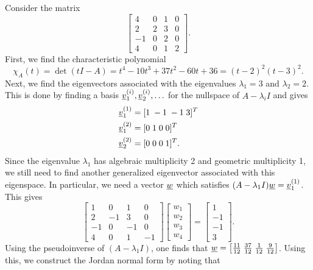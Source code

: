 \begin{example}
Consider the matrix
\begin{equation*}
\begin{bmatrix} 4 & 0 & 1 & 0 \\ 2 & 2 & 3 & 0 \\ -1 & 0 & 2 & 0 \\ 4 & 0 & 1 & 2 \end{bmatrix} .
\end{equation*}
First, we find the characteristic polynomial
\[ \chi_A (t) = \det (t I - A) = t^4 - 10 t^3 + 37 t^2 -60 t + 36 = (t-2)^2 (t-3)^2. \]
Next, we find the eigenvectors associated with the eigenvalues $\lambda_1 = 3$ and $\lambda_2 = 2$.
This is done by finding a basis $\underline{v}^{(i)}_1, \underline{v}^{(i)}_2, \ldots$ for the nullspace of $A - \lambda_i I$ and gives
\begin{align*}
\underline{v}_1^{(1)} & = [ 1 \; -1 \; -1 \; 3 ]^T \\
\underline{v}_1^{(2)} & = [ 0 \; 1 \; 0 \; 0 ]^T \\
\underline{v}_2^{(2)} & = [ 0 \; 0 \; 0 \; 1 ]^T.
\end{align*}
Since the eigenvalue $\lambda_1$ has algebraic multiplicity 2 and geometric multiplicity 1, we still need to find another generalized eigenvector associated with this eigenspace.
In particular, we need a vector $\underline{w}$ which satisfies $(A - \lambda_1 I) \underline{w} = \underline{v}^{(1)}_1$.
This gives
\begin{equation*}
\begin{bmatrix} 1 & 0 & 1 & 0 \\ 2 & -1 & 3 & 0 \\ -1 & 0 & -1 & 0 \\ 4 & 0 & 1 & -1 \end{bmatrix}
\begin{bmatrix} w_1 \\ w_2 \\ w_3 \\ w_4 \end{bmatrix}
= \begin{bmatrix} 1 \\ -1 \\ -1 \\ 3 \end{bmatrix} .
\end{equation*}
Using the pseudoinverse of $(A-\lambda_1 I)$, one finds that $\underline{w} = \left[ \frac{11}{12} \; \frac{37}{12} \; \frac{1}{12} \; \frac{9}{12} \right]$.
Using this, we construct the Jordan normal form by noting that

\end{example}
